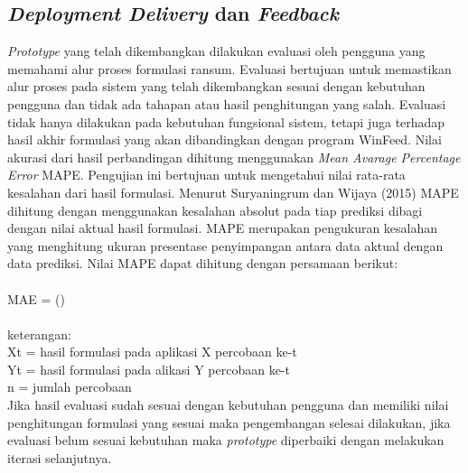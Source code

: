 \subsection*{\textit{Deployment Delivery} dan \textit{Feedback}}

\textit{Prototype }yang telah dikembangkan dilakukan evaluasi oleh pengguna yang memahami alur proses formulasi ransum. Evaluasi bertujuan untuk memastikan alur proses pada sistem yang telah dikembangkan sesuai dengan kebutuhan pengguna dan tidak ada tahapan atau hasil penghitungan yang salah. Evaluasi tidak hanya dilakukan pada kebutuhan fungsional sistem, tetapi juga terhadap hasil akhir formulasi yang akan dibandingkan dengan program WinFeed. Nilai akurasi dari hasil perbandingan dihitung menggunakan \textit{Mean Avarage Percentage Error} MAPE. Pengujian ini bertujuan untuk mengetahui nilai rata-rata kesalahan dari hasil formulasi. Menurut Suryaningrum dan Wijaya (2015) MAPE dihitung dengan menggunakan kesalahan absolut pada tiap prediksi dibagi dengan nilai aktual hasil formulasi. MAPE merupakan pengukuran kesalahan yang menghitung ukuran presentase penyimpangan antara data aktual dengan data prediksi. Nilai MAPE dapat dihitung dengan persamaan berikut:\\

\\
MAE =  ()
\\

\\
keterangan:\\
Xt	=	hasil formulasi pada aplikasi X percobaan ke-t\\
Yt	=	hasil formulasi pada alikasi Y percobaan ke-t\\
n	=	jumlah percobaan\\

Jika hasil evaluasi sudah sesuai dengan kebutuhan pengguna dan memiliki nilai penghitungan formulasi yang sesuai maka pengembangan selesai dilakukan, jika evaluasi belum sesuai kebutuhan maka \textit{prototype} diperbaiki dengan melakukan iterasi selanjutnya. 
